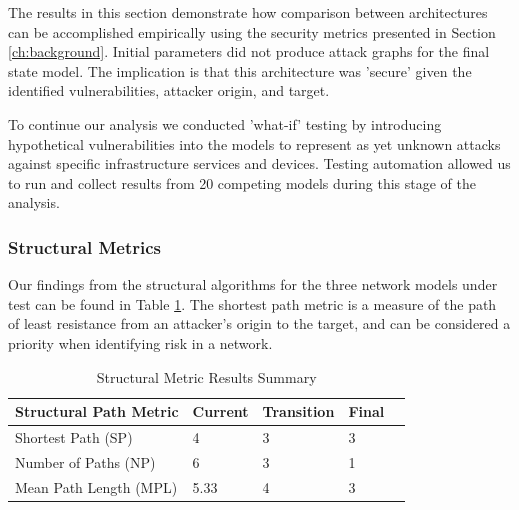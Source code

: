 % 


The results in this section demonstrate how comparison between architectures can be accomplished empirically using the security metrics presented in Section \ref{ch:background}. Initial parameters did not produce attack graphs for the final state model. The implication is that this architecture was 'secure' given the identified vulnerabilities, attacker origin, and target. 

To continue our analysis we conducted 'what-if' testing by introducing hypothetical vulnerabilities into the models to represent as yet unknown attacks against specific infrastructure services and devices. Testing automation allowed us to run and collect results from 20 competing models during this stage of the analysis. 


\subsubsection{Structural Metrics}\label{subsec:results:sp}
% 

Our findings from the structural algorithms for the three network models under test can be found in Table \ref{tab:sp_results}. The shortest path metric is a measure of the path of least resistance from an attacker's origin to the target, and can be considered a priority when identifying risk in a network. %

\begin{table}[ht]
\caption{Structural Metric Results Summary}
\begin{tabular}{@{}lllll@{}}
\toprule
Structural Path Metric & Current & Transition & Final &  \\ \midrule
Shortest Path (SP) & 4 & 3 & 3 &  \\
Number of Paths (NP) & 6 & 3 & 1 &  \\
Mean Path Length (MPL) & 5.33 & 4 & 3 &  \\ \bottomrule
\end{tabular}
\label{tab:sp_results}
\end{table}

